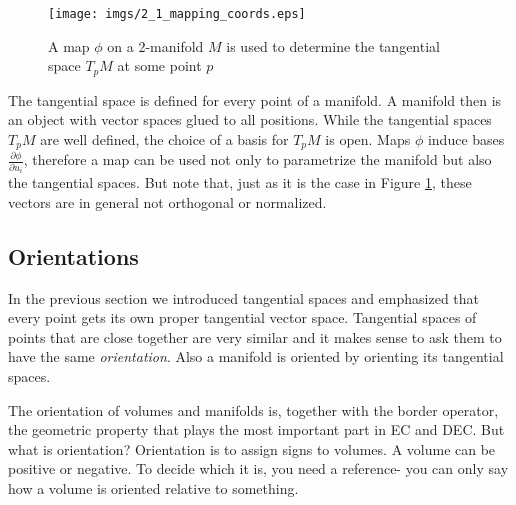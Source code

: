 \begin{figure}[tb]
\begin{center}
\texttt{[image: imgs/2\_1\_mapping\_coords.eps]}
\end{center}
\caption{A map $\phi$ on a 2-manifold $M$ is used to determine the tangential space $T_{p}M$ at some point $p$}
\label{fig::2_1_mapping_coords}
\end{figure}

The tangential space is defined for every point of a manifold. A manifold then is an object with vector spaces glued to all positions. While the tangential spaces $T_pM$  are well defined, the choice of a basis for $T_pM$ is open. Maps $\phi$ induce bases $\frac{\partial \phi}{\partial u_i}$, therefore a map can be used not only to parametrize the manifold but also the tangential spaces. But note that, just as it is the case in Figure \ref{fig::2_1_mapping_coords}, these vectors are in general not orthogonal or normalized. 

		
\subsection{Orientations}

In the previous section we introduced tangential spaces and emphasized that every point gets its own proper tangential vector space. Tangential spaces of points that are close together are very similar and it makes sense to ask them to have the same \emph{orientation}. Also a manifold is oriented by orienting its tangential spaces. 

The orientation of volumes and manifolds is, together with the border operator, the geometric property that plays the most important part in EC and DEC. But what is orientation? Orientation is to assign signs to volumes. A volume can be positive or negative. To decide which it is, you need a reference- you can only say how a volume is oriented relative to something.


